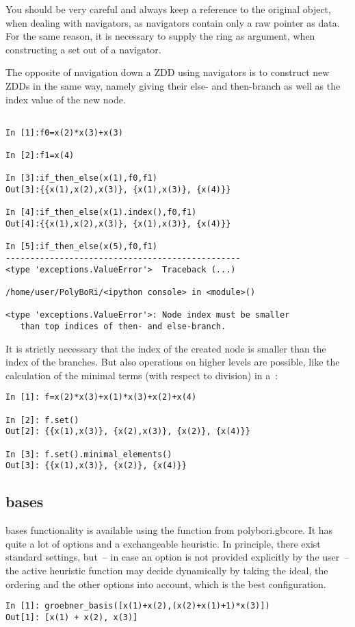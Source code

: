 You should be very careful and always keep a reference to the original object, when dealing with navigators, as navigators contain only a raw pointer as data.
For the same reason, it is necessary to supply the ring as argument, when constructing a set out of a navigator.

The opposite of navigation down a ZDD using navigators is to construct new ZDDs in the same way, namely giving their else- and then-branch as well as the index value of the new node.

\begin{lstlisting}
    
In [1]:f0=x(2)*x(3)+x(3)

In [2]:f1=x(4)

In [3]:if_then_else(x(1),f0,f1)
Out[3]:{{x(1),x(2),x(3)}, {x(1),x(3)}, {x(4)}}

In [4]:if_then_else(x(1).index(),f0,f1)
Out[4]:{{x(1),x(2),x(3)}, {x(1),x(3)}, {x(4)}}

In [5]:if_then_else(x(5),f0,f1)
------------------------------------------------
<type 'exceptions.ValueError'>  Traceback (...) 

/home/user/PolyBoRi/<ipython console> in <module>()

<type 'exceptions.ValueError'>: Node index must be smaller
   than top indices of then- and else-branch.
\end{lstlisting}

It is strictly necessary that the index of the created node is smaller than the index of the branches.
%
%
But also operations on higher levels are possible, like the calculation of the minimal terms (with respect to division) in a~:
\begin{lstlisting}
In [1]: f=x(2)*x(3)+x(1)*x(3)+x(2)+x(4)

In [2]: f.set()
Out[2]: {{x(1),x(3)}, {x(2),x(3)}, {x(2)}, {x(4)}}

In [3]: f.set().minimal_elements()
Out[3]: {{x(1),x(3)}, {x(2)}, {x(4)}}
\end{lstlisting}
\subsection{\Groebner bases}
\Groebner bases functionality is available using the function  from polybori.gbcore.
It has quite a lot of options and a exchangeable heuristic.
In principle, there exist  standard settings, but~-- in case an option is not
provided explicitly by the user~-- the active heuristic function
may decide dynamically by taking the ideal, the ordering and the other options into account, which is the best configuration.
\begin{lstlisting}
In [1]: groebner_basis([x(1)+x(2),(x(2)+x(1)+1)*x(3)])
Out[1]: [x(1) + x(2), x(3)]
\end{lstlisting}

